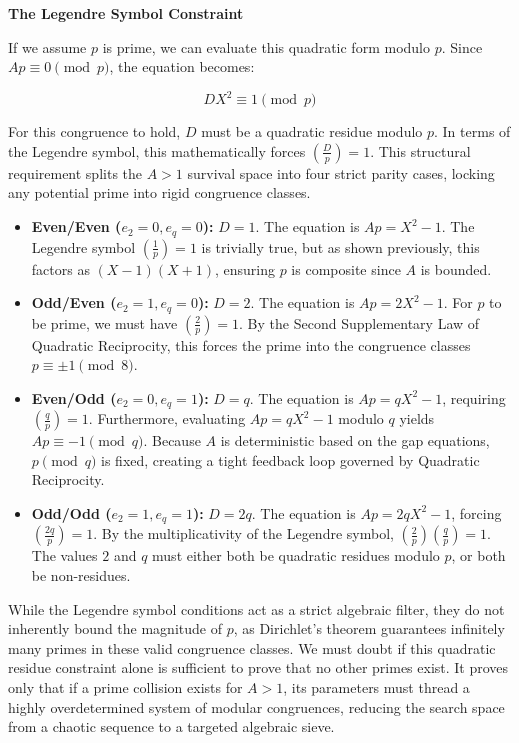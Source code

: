 \documentclass{article}
\begin{document}
\textbf{The Legendre Symbol Constraint}

If we assume $p$ is prime, we can evaluate this quadratic form modulo $p$. Since $Ap \equiv 0 \pmod p$, the equation becomes:

$$DX^2 \equiv 1 \pmod p$$

For this congruence to hold, $D$ must be a quadratic residue modulo $p$. In terms of the Legendre symbol, this mathematically forces $\left( \frac{D}{p} \right) = 1$. This structural requirement splits the $A > 1$ survival space into four strict parity cases, locking any potential prime into rigid congruence classes.

\begin{itemize}
    \item \textbf{Even/Even ($e_2 = 0, e_q = 0$):} $D = 1$. The equation is $Ap = X^2 - 1$. The Legendre symbol $\left(\frac{1}{p}\right) = 1$ is trivially true, but as shown previously, this factors as $(X-1)(X+1)$, ensuring $p$ is composite since $A$ is bounded.
    \item \textbf{Odd/Even ($e_2 = 1, e_q = 0$):} $D = 2$. The equation is $Ap = 2X^2 - 1$. For $p$ to be prime, we must have $\left( \frac{2}{p} \right) = 1$. By the Second Supplementary Law of Quadratic Reciprocity, this forces the prime into the congruence classes $p \equiv \pm 1 \pmod 8$.
    \item \textbf{Even/Odd ($e_2 = 0, e_q = 1$):} $D = q$. The equation is $Ap = qX^2 - 1$, requiring $\left( \frac{q}{p} \right) = 1$. Furthermore, evaluating $Ap = qX^2 - 1$ modulo $q$ yields $Ap \equiv -1 \pmod q$. Because $A$ is deterministic based on the gap equations, $p \pmod q$ is fixed, creating a tight feedback loop governed by Quadratic Reciprocity.
    \item \textbf{Odd/Odd ($e_2 = 1, e_q = 1$):} $D = 2q$. The equation is $Ap = 2qX^2 - 1$, forcing $\left( \frac{2q}{p} \right) = 1$. By the multiplicativity of the Legendre symbol, $\left( \frac{2}{p} \right) \left( \frac{q}{p} \right) = 1$. The values $2$ and $q$ must either both be quadratic residues modulo $p$, or both be non-residues.
\end{itemize}

While the Legendre symbol conditions act as a strict algebraic filter, they do not inherently bound the magnitude of $p$, as Dirichlet's theorem guarantees infinitely many primes in these valid congruence classes. We must doubt if this quadratic residue constraint alone is sufficient to prove that no other primes exist. It proves only that if a prime collision exists for $A > 1$, its parameters must thread a highly overdetermined system of modular congruences, reducing the search space from a chaotic sequence to a targeted algebraic sieve.
\end{document}
